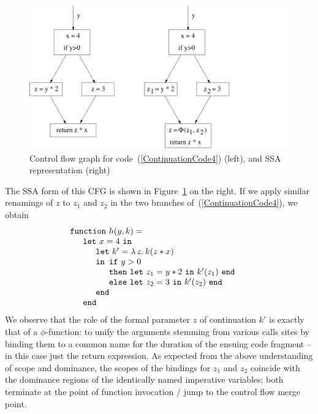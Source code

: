 \begin{figure}
\begin{center}
\includegraphics[scale=0.5]{FunctionalCode1CFG}
\end{center}
\caption{\label{FigureCFGForSharedContinuation} Control flow graph for code~(\ref{ContinuationCode4}) (left), and SSA representation (right)}
\end{figure}

The SSA form of this CFG is shown in
Figure~\ref{FigureCFGForSharedContinuation} on the right. If we apply
similar renamings of $z$ to $z_1$ and $z_2$ in the two branches
of~(\ref{ContinuationCode4}), we obtain
\begin{equation}
\label{ContinuationCode5}
\begin{array}{l}
\mathtt{function}\ h (y, k) =\\
\quad
  \begin{array}{l}
    \mathtt{let}\ x=4\ \mathtt{in} \\
    \quad \begin{array}{l}
            \mathtt{let}\ k' = \lambda\, z .\, k (z*x)\\
            \mathtt{in}
               \begin{array}[t]{l}
                 \mathtt{if}\ y>0\\
                 \mathtt{then\ let}\ z_1 = y*2\ \mathtt{in}\ k'(z_1)\ \mathtt{end}\\
                 \mathtt{else\ let}\ z_2 = 3\ \mathtt{in}\ k'(z_2)\ \mathtt{end}
               \end{array}\\
            \mathtt{end}
          \end{array} \\
    \mathtt{end}
  \end{array}
\end{array}
\end{equation}
We observe that the role of the formal parameter $z$ of continuation
$k'$ is exactly that of a $\phi$-function: to unify the arguments
stemming from various calls sites by binding them to a common name for
the duration of the ensuing code fragment -- in this case just the
return expression. As expected from the above understanding of scope
and dominance, the scopes of the bindings for $z_1$ and $z_2$ coincide
with the dominance regions of the identically named imperative
variables: both terminate at the point of function invocation / jump
to the control flow merge point.


